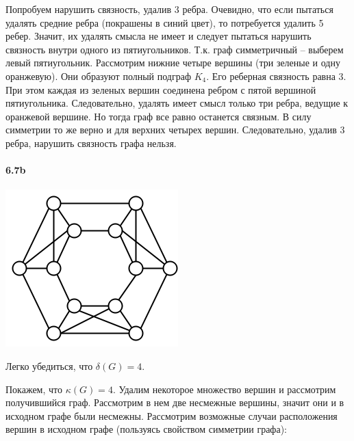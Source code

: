 \documentclass[russian]{article}
\begin{document}
Попробуем нарушить связность, удалив 3 ребра. Очевидно, что если пытаться
удалять средние ребра (покрашены в синий цвет), то потребуется удалить
5 ребер. Значит, их удалять смысла не имеет и следует пытаться нарушить
связность внутри одного из пятиугольников. Т.к. граф симметричный
-- выберем левый пятиугольник. Рассмотрим нижние четыре вершины (три
зеленые и одну оранжевую). Они образуют полный подграф $K_4$. Его реберная связность равна 3. При этом каждая из зеленых вершин соединена ребром с пятой вершиной пятиугольника. Следовательно, удалять имеет смысл только
три ребра, ведущие к оранжевой вершине. Но тогда граф все равно останется
связным. В силу симметрии то же верно и для верхних четырех вершин.
Следовательно, удалив 3 ребра, нарушить связность графа нельзя.


\paragraph{6.7b}

\begin{center}
\includegraphics[scale=0.5]{6_7b_1.png}
\par\end{center}

Легко убедиться, что $\delta(G)=4$.

Покажем, что $\kappa(G)=4$. Удалим некоторое множество вершин и рассмотрим
получившийся граф. Рассмотрим в нем две несмежные вершины, значит
они и в исходном графе были несмежны. Рассмотрим возможные случаи
расположения вершин в исходном графе (пользуясь свойством симметрии
графа):
\end{document}
